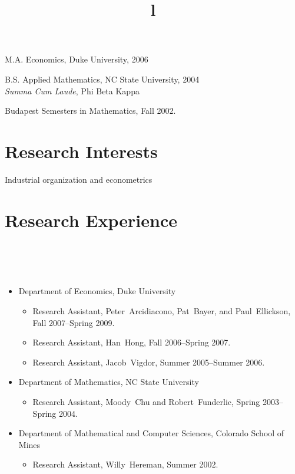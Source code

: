 \documentclass[overlapped,line,letterpaper]{res}
\begin{document}
\begin{resume}
M.A. Economics, Duke University, 2006

B.S. Applied Mathematics, NC State University, 2004 \\
{\it Summa Cum Laude}, Phi Beta Kappa

Budapest Semesters in Mathematics, Fall 2002.

\section{\bf Research Interests}

Industrial organization and econometrics

\section{\bf Research Experience}

\begin{format}
\title{l}\\
\\
\body\\
\end{format}

\begin{itemize}
\item Department of Economics, Duke University
  \begin{itemize}
  \item Research Assistant, Peter\ Arcidiacono, Pat\ Bayer, and Paul\
    Ellickson, Fall 2007--Spring 2009.
  \item Research Assistant, Han\ Hong, Fall 2006--Spring 2007.
  \item Research Assistant, Jacob\ Vigdor, Summer 2005--Summer 2006.
  \end{itemize}

\item Department of Mathematics, NC State University
  \begin{itemize}
  \item Research Assistant, Moody\ Chu and Robert\ Funderlic, Spring
    2003--Spring 2004.
  \end{itemize}

\item Department of Mathematical and Computer Sciences, Colorado School
    of Mines
  \begin{itemize}
  \item Research Assistant, Willy\ Hereman, Summer 2002.
  \end{itemize}
\end{itemize}


\end{resume}
\end{document}
